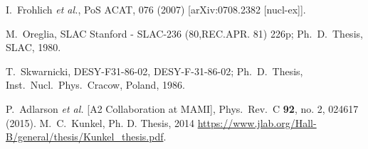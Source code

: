 \documentclass[aps,prc,twocolumn,floatfix,showpacs,preprintnumbers,amsmath,amssymb,superscriptaddress,linenumbers]{revtex4-1}
\begin{document}
\begin{thebibliography}{99}
 I.~Frohlich {\it et al.}, 
	PoS ACAT{\bf }, 076 (2007) [arXiv:0708.2382 [nucl-ex]].

  M.~Oreglia,
  SLAC Stanford - SLAC-236 (80,REC.APR. 81) 226p; 
  Ph.~D.~Thesis, SLAC, 1980.

  T.~Skwarnicki,
  DESY-F31-86-02, DESY-F-31-86-02;
  Ph.~D.~Thesis, Inst.\ Nucl.\ Phys.\ Cracow, Poland, 1986.

  P.~Adlarson {\it et al.} [A2 Collaboration at MAMI],
  Phys.\ Rev.\ C {\bf 92}, no. 2, 024617 (2015).
   M.~C.~Kunkel,  Ph. D. Thesis, 2014 
  \url{https://www.jlab.org/Hall-B/general/thesis/Kunkel_thesis.pdf}.
  
\end{thebibliography}
\end{document}
